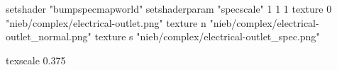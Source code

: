 setshader "bumpspecmapworld"
setshaderparam "specscale" 1 1 1
   texture 0 "nieb/complex/electrical-outlet.png"
   texture n "nieb/complex/electrical-outlet_normal.png"
   texture s "nieb/complex/electrical-outlet_spec.png"

texscale 0.375